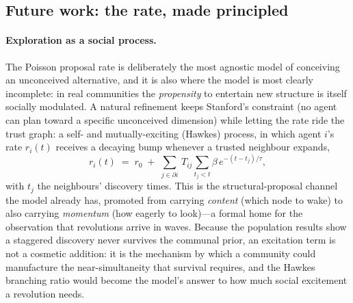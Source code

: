 \subsection{Future work: the rate, made principled}
\label{app:exploration-future}

\paragraph{Exploration as a social process.}
The Poisson proposal rate is deliberately the most agnostic model of conceiving an unconceived
alternative, and it is also where the model is most clearly incomplete: in real communities the
\emph{propensity} to entertain new structure is itself socially modulated. A natural refinement
keeps Stanford's constraint (no agent can plan toward a specific unconceived dimension) while
letting the rate ride the trust graph: a self- and mutually-exciting (Hawkes) process, in which
agent $i$'s rate $r_i(t)$ receives a decaying bump whenever a trusted neighbour expands,
\begin{equation}
r_i(t) \;=\; r_0 \;+\; \sum_{j\in\partial i}\, T_{ij} \sum_{t_j < t} \beta\, e^{-(t-t_j)/\tau},
\end{equation}
with $t_j$ the neighbours' discovery times. This is the structural-proposal channel the model
already has, promoted from carrying \emph{content} (which node to wake) to also carrying
\emph{momentum} (how eagerly to look)---a formal home for the observation that revolutions
arrive in waves. Because the population results show a staggered discovery never survives the
communal prior, an excitation term is not a cosmetic addition: it is the mechanism by which a
community could manufacture the near-simultaneity that survival requires, and the Hawkes
branching ratio would become the model's answer to how much social excitement a revolution
needs.

